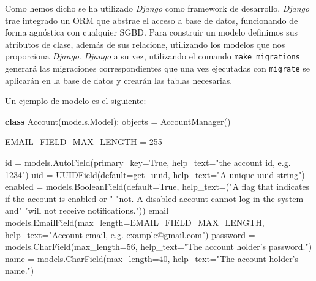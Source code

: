 \documentclass[12pt,a4paperpaper,]{report}
\newenvironment{Shaded}{}{}
\newcommand{\KeywordTok}[1]{\textcolor[rgb]{0.00,0.44,0.13}{\textbf{#1}}}
\newcommand{\DecValTok}[1]{\textcolor[rgb]{0.25,0.63,0.44}{#1}}
\newcommand{\StringTok}[1]{\textcolor[rgb]{0.25,0.44,0.63}{#1}}
\newcommand{\VariableTok}[1]{\textcolor[rgb]{0.10,0.09,0.49}{#1}}
\newcommand{\OperatorTok}[1]{\textcolor[rgb]{0.40,0.40,0.40}{#1}}
\newcommand{\BuiltInTok}[1]{#1}
\newcommand{\NormalTok}[1]{#1}
\begin{document}
Como hemos dicho se ha utilizado \emph{Django} como framework de
desarrollo, \emph{Django} trae integrado un ORM que abstrae el acceso a
base de datos, funcionando de forma agnóstica con cualquier SGBD. Para
construir un modelo definimos sus atributos de clase, además de sus
relacione, utilizando los modelos que nos proporciona \emph{Django}.
\emph{Django} a su vez, utilizando el comando \texttt{make\ migrations}
generará las migraciones correspondientes que una vez ejecutadas con
\texttt{migrate} se aplicarán en la base de datos y crearán las tablas
necesarias.

Un ejemplo de modelo es el siguiente:

\begin{Shaded}
\begin{Highlighting}[]

\KeywordTok{class}\NormalTok{ Account(models.Model):}
\NormalTok{    objects }\OperatorTok{=}\NormalTok{ AccountManager()}

\NormalTok{    EMAIL_FIELD_MAX_LENGTH }\OperatorTok{=} \DecValTok{255}

    \BuiltInTok{id} \OperatorTok{=}\NormalTok{ models.AutoField(primary_key}\OperatorTok{=}\VariableTok{True}\NormalTok{,}
\NormalTok{                          help_text}\OperatorTok{=}\StringTok{"the account id, e.g. 1234"}\NormalTok{)}
\NormalTok{    uid }\OperatorTok{=}\NormalTok{ UUIDField(default}\OperatorTok{=}\NormalTok{get_uuid,}
\NormalTok{                    help_text}\OperatorTok{=}\StringTok{"A unique uuid string"}\NormalTok{)}
\NormalTok{    enabled }\OperatorTok{=}\NormalTok{ models.BooleanField(default}\OperatorTok{=}\VariableTok{True}\NormalTok{,}
\NormalTok{                                  help_text}\OperatorTok{=}\NormalTok{(}\StringTok{"A flag that indicates if the account is enabled or "}
                                             \StringTok{"not. A disabled account cannot log in the system and"}
                                             \StringTok{"will not receive notifications."}\NormalTok{))}
\NormalTok{    email }\OperatorTok{=}\NormalTok{ models.EmailField(max_length}\OperatorTok{=}\NormalTok{EMAIL_FIELD_MAX_LENGTH,}
\NormalTok{                              help_text}\OperatorTok{=}\StringTok{"Account email, e.g. example@gmail.com"}\NormalTok{)}
\NormalTok{    password }\OperatorTok{=}\NormalTok{ models.CharField(max_length}\OperatorTok{=}\DecValTok{56}\NormalTok{,}
\NormalTok{                                help_text}\OperatorTok{=}\StringTok{"The account holder's password."}\NormalTok{)}
\NormalTok{    name }\OperatorTok{=}\NormalTok{ models.CharField(max_length}\OperatorTok{=}\DecValTok{40}\NormalTok{,}
\NormalTok{                            help_text}\OperatorTok{=}\StringTok{"The account holder's name."}\NormalTok{)}
\end{Highlighting}
\end{Shaded}
\end{document}
